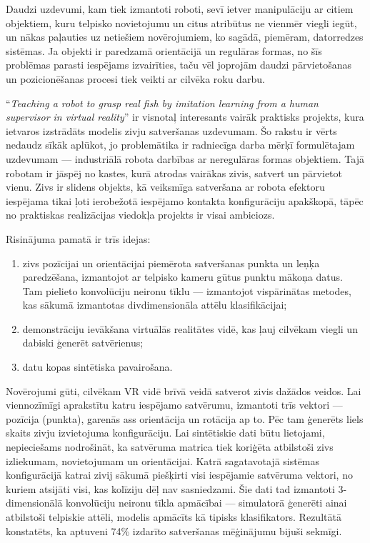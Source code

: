 \documentclass[12pt, a4paper]{article}
\numberwithin{equation}{section} %
\begin{document}
Daudzi uzdevumi, kam tiek izmantoti roboti, sevī ietver manipulāciju ar citiem objektiem, kuru telpisko novietojumu un citus atribūtus ne vienmēr viegli iegūt, un nākas paļauties uz netiešiem novērojumiem, ko sagādā, piemēram, datorredzes sistēmas. Ja objekti ir paredzamā orientācijā un regulāras formas, no šīs problēmas parasti iespējams izvairīties, taču vēl joprojām daudzi pārvietošanas un pozicionēšanas procesi tiek veikti ar cilvēka roku darbu.

``\textit{Teaching a robot to grasp real fish by imitation learning from a human supervisor in virtual reality}'' \cite{dyrstad2018teaching} ir visnotaļ interesants vairāk praktisks projekts, kura ietvaros izstrādāts modelis zivju satveršanas uzdevumam. Šo rakstu ir vērts nedaudz sīkāk aplūkot, jo problemātika ir radniecīga darba mērķī formulētajam uzdevumam --- industriālā robota darbības ar neregulāras formas objektiem. Tajā robotam ir jāspēj no kastes, kurā atrodas vairākas zivis, satvert un pārvietot vienu. Zivs ir slidens objekts, kā veiksmīga satveršana ar robota efektoru iespējama tikai ļoti ierobežotā iespējamo kontakta konfigurāciju apakškopā, tāpēc no praktiskas realizācijas viedokļa projekts ir visai ambiciozs. 

Risinājuma pamatā ir trīs idejas:

\begin{enumerate}
    \item zivs pozīcijai un orientācijai piemērota satveršanas punkta un leņķa paredzēšana, izmantojot ar telpisko kameru gūtus punktu mākoņa datus. Tam pielieto konvolūciju neironu tīklu --- izmantojot vispārinātas metodes, kas sākumā izmantotas divdimensionāla attēlu klasifikācijai;
    \item demonstrāciju ievākšana virtuālās realitātes vidē, kas ļauj cilvēkam viegli un dabiski ģenerēt satvērienus;
    \item datu kopas sintētiska pavairošana.
\end{enumerate}

Novērojumi gūti, cilvēkam VR vidē brīvā veidā satverot zivis dažādos veidos. Lai viennozīmīgi aprakstītu katru iespējamo satvērumu, izmantoti trīs vektori --- pozīcija (punkta), garenās ass orientācija un rotācija ap to.  Pēc tam ģenerēts liels skaits zivju izvietojuma konfigurāciju. Lai sintētiskie dati būtu lietojami, nepieciešams nodrošināt, ka satvēruma matrica tiek koriģēta atbilstoši zivs izliekumam, novietojumam un orientācijai. Katrā sagatavotajā sistēmas konfigurācijā katrai zivij sākumā piešķirti visi iespējamie satvēruma vektori, no kuriem atsijāti visi, kas kolīziju dēļ nav sasniedzami. Šie dati tad izmantoti 3-dimensionālā konvolūciju neironu tīkla apmācībai --- simulatorā ģenerēti ainai atbilstoši telpiskie attēli, modelis apmācīts kā tipisks klasifikators. Rezultātā konstatēts, ka aptuveni 74\% izdarīto satveršanas mēģinājumu bijuši sekmīgi.
\end{document}
